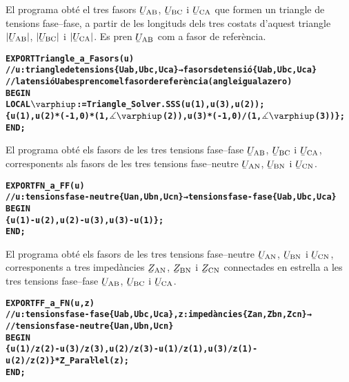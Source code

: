 El programa  obté el tres fasors $\cmplx{U}\ped{AB}$, $\cmplx{U}\ped{BC}$ i $\cmplx{U}\ped{CA}$ que formen un triangle de tensions fase--fase, a partir de les longituds dels tres costats d'aquest triangle $|\cmplx{U}\ped{AB}|$, $|\cmplx{U}\ped{BC}|$ i $|\cmplx{U}\ped{CA}|$. Es pren $\cmplx{U}\ped{AB}$ com a fasor de referència.
\vspace{-6mm}
\begin{alltt}
\bfseries
{}
    EXPORT Triangle_a_Fasors(u)
    // u:triangle de tensions \{Uab,Ubc,Uca\} → fasors de tensió \{Uab,Ubc,Uca\}
    // la tensió Uab es pren com el fasor de referència (angle igual a zero)
    BEGIN
      LOCAL \(\varphiup\):=Triangle_Solver.SSS(u(1),u(3),u(2));
      \{u(1),u(2)*(-1,0)*(1,\(\measuredangle\varphiup\)(2)),u(3)*(-1,0)/(1,\(\measuredangle\varphiup\)(3))\};
    END;
\end{alltt}

El programa  obté els fasors de les tres tensions fase--fase $\cmplx{U}\ped{AB}$, $\cmplx{U}\ped{BC}$ i $\cmplx{U}\ped{CA}$, corresponents als fasors de les tres tensions fase--neutre
$\cmplx{U}\ped{AN}$, $\cmplx{U}\ped{BN}$ i $\cmplx{U}\ped{CN}$.
\vspace{-6mm}
\begin{alltt}
\bfseries
{}
    EXPORT FN_a_FF(u)
    // u:tensions fase-neutre \{Uan,Ubn,Ucn\} → tensions fase-fase \{Uab,Ubc,Uca\}
    BEGIN
      \{u(1)-u(2),u(2)-u(3),u(3)-u(1)\};
    END;
\end{alltt}

El programa  obté els fasors de les tres tensions fase--neutre $\cmplx{U}\ped{AN}$, $\cmplx{U}\ped{BN}$ i $\cmplx{U}\ped{CN}$, corresponents a tres impedàncies $\cmplx{Z}\ped{AN}$, $\cmplx{Z}\ped{BN}$ i $\cmplx{Z}\ped{CN}$ connectades en estrella a  les tres tensions fase--fase
$\cmplx{U}\ped{AB}$, $\cmplx{U}\ped{BC}$ i $\cmplx{U}\ped{CA}$.
\vspace{-6mm}
\begin{alltt}
\bfseries
{}
    EXPORT FF_a_FN(u,z)
    // u:tensions fase-fase \{Uab,Ubc,Uca\}, z:impedàncies \{Zan,Zbn,Zcn\} →
    // tensions fase-neutre \{Uan,Ubn,Ucn\}
    BEGIN
      \{u(1)/z(2)-u(3)/z(3),u(2)/z(3)-u(1)/z(1),u(3)/z(1)-u(2)/z(2)\}*Z_Paraŀlel(z);
    END;
\end{alltt}

